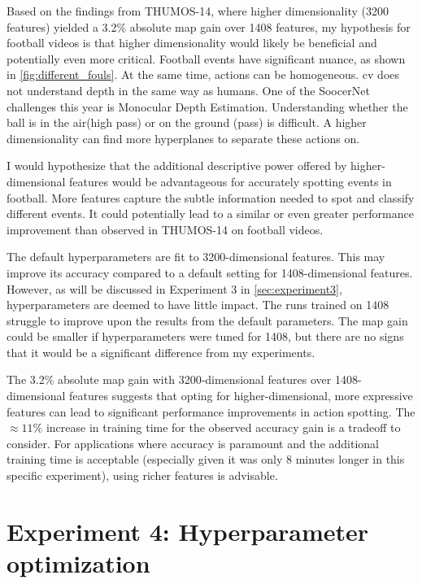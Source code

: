 Based on the findings from THUMOS-14, where higher dimensionality (3200 features) yielded a 3.2\% absolute \acrshort{map} gain over 1408 features, my hypothesis for football videos is that higher dimensionality would likely be beneficial and potentially even more critical. Football events have significant nuance, as shown in \cref{fig:different_fouls}. At the same time, actions can be homogeneous. \acrshort{cv} does not understand depth in the same way as humans. One of the SoocerNet challenges this year is Monocular Depth Estimation. Understanding whether the ball is in the air(high pass) or on the ground (pass) is difficult. A higher dimensionality can find more hyperplanes to separate these actions on. 

I would hypothesize that the additional descriptive power offered by higher-dimensional features would be advantageous for accurately spotting events in football. More features capture the subtle information needed to spot and classify different events. It could potentially lead to a similar or even greater performance improvement than observed in THUMOS-14 on football videos.

The default hyperparameters are fit to 3200-dimensional features. This may improve its accuracy compared to a default setting for 1408-dimensional features. However, as will be discussed in Experiment 3 in \autoref{sec:experiment3}, hyperparameters are deemed to have little impact. The runs trained on 1408 struggle to improve upon the results from the default parameters. The \acrshort{map} gain could be smaller if hyperparameters were tuned for 1408, but there are no signs that it would be a significant difference from my experiments. 

The 3.2\% absolute \acrshort{map} gain with 3200-dimensional features over 1408-dimensional features suggests that opting for higher-dimensional, more expressive features can lead to significant performance improvements in action spotting. The \(\approx11\%\) increase in training time for the observed accuracy gain is a tradeoff to consider. For applications where accuracy is paramount and the additional training time is acceptable (especially given it was only 8 minutes longer in this specific experiment), using richer features is advisable.


\section{Experiment 4: Hyperparameter optimization}
\label{sec:experiment4}

